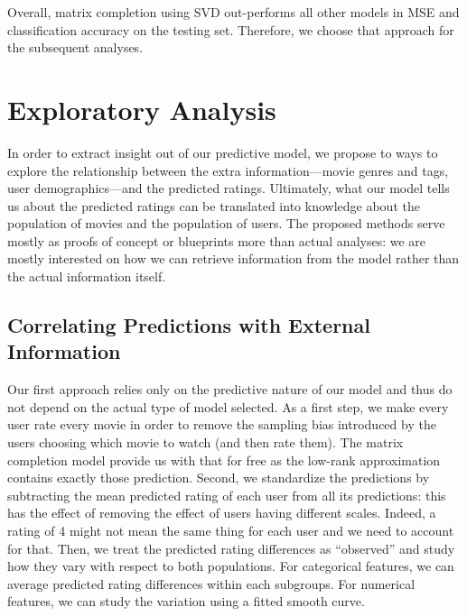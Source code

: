 \documentclass[bj, preprint]{imsart}
\begin{document}
Overall, matrix completion using SVD out-performs all other models in MSE and classification accuracy on the testing set. Therefore, we choose that approach for the subsequent analyses.




\section{Exploratory Analysis}\label{sec:explore}

In order to extract insight out of our predictive model, we propose to ways to explore the relationship between the extra information---movie genres and tags, user demographics---and the predicted ratings. Ultimately, what our model tells us about the predicted ratings can be translated into knowledge about the population of movies and the population of users. The proposed methods serve mostly as proofs of concept or blueprints more than actual analyses: we are mostly interested on how we can retrieve information from the model rather than the actual information itself.

\subsection{Correlating Predictions with External Information}\label{subsec:explore.corr}

Our first approach relies only on the predictive nature of our model and thus do not depend on the actual type of model selected. As a first step, we make every user rate every movie in order to remove the sampling bias introduced by the users choosing which movie to watch (and then rate them). The matrix completion model provide us with that for free as the low-rank approximation contains exactly those prediction. Second, we standardize the predictions by subtracting the mean predicted rating of each user from all its predictions: this has the effect of removing the effect of users having different scales. Indeed, a rating of 4 might not mean the same thing for each user and we need to account for that. Then, we treat the predicted rating differences as ``observed'' and study how they vary with respect to both populations. For categorical features, we can average predicted rating differences within each subgroups. For numerical features, we can study the variation using a fitted smooth curve.
\end{document}
